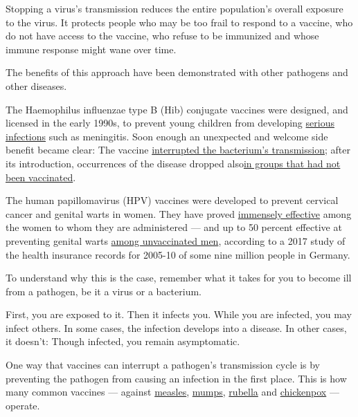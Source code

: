Stopping a virus's transmission reduces the entire population's overall
exposure to the virus. It protects people who may be too frail to
respond to a vaccine, who do not have access to the vaccine, who refuse
to be immunized and whose immune response might wane over time.

The benefits of this approach have been demonstrated with other
pathogens and other diseases.

The Haemophilus influenzae type B (Hib) conjugate vaccines were
designed, and licensed in the early 1990s, to prevent young children
from developing
\href{https://journals.lww.com/pidj/Abstract/1988/03000/Efficacy_of_Haemophilus_influenzae_type_b_capsular.3.aspx}{serious
infections} such as meningitis. Soon enough an unexpected and welcome
side benefit became clear: The vaccine
\href{https://academic.oup.com/jid/article-abstract/171/1/93/904530?redirectedFrom=fulltext}{interrupted
the bacterium's transmission}; after its introduction, occurrences of
the disease dropped
also\href{https://www.sciencedirect.com/science/article/pii/S0264410X10004755}{in
groups that had not been vaccinated}.

The human papillomavirus (HPV) vaccines were developed to prevent
cervical cancer and genital warts in women. They have proved
\href{https://www.cdc.gov/vaccines/vpd/hpv/hcp/vaccines.html}{immensely
effective} among the women to whom they are administered --- and up to
50 percent effective at preventing genital warts
\href{https://bmcinfectdis.biomedcentral.com/articles/10.1186/s12879-017-2663-7}{among
unvaccinated men}, according to a 2017 study of the health insurance
records for 2005-10 of some nine million people in Germany.

To understand why this is the case, remember what it takes for you to
become ill from a pathogen, be it a virus or a bacterium.

First, you are exposed to it. Then it infects you. While you are
infected, you may infect others. In some cases, the infection develops
into a disease. In other cases, it doesn't: Though infected, you remain
asymptomatic.

One way that vaccines can interrupt a pathogen's transmission cycle is
by preventing the pathogen from causing an infection in the first place.
This is how many common vaccines --- against
\href{https://www.who.int/immunization/sage/Module_on_Measles_Immunology_26Aug08.pdf?ua=1}{measles},
\href{https://apps.who.int/iris/bitstream/handle/10665/97885/9789241500661_eng.pdf;jsessionid=06BE7879E677A7A70606302A705BA98E?sequence=1}{mumps},
\href{https://apps.who.int/iris/bitstream/handle/10665/43922/9789241596848_eng.pdf?sequence=1}{rubella}
and
\href{https://apps.who.int/iris/bitstream/handle/10665/43906/9789241596770_eng.pdf?sequence=1}{chickenpox}
--- operate.


